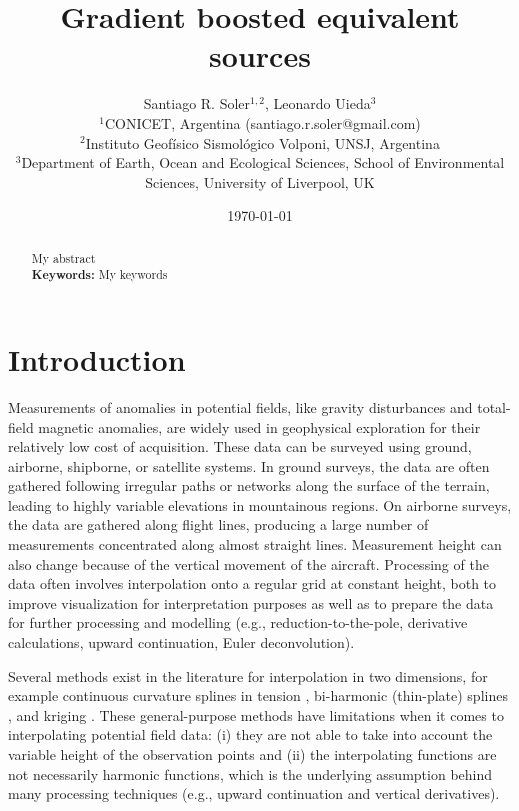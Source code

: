 \documentclass[twocolumn]{article}
\makeatletter
\newcommand{\Title}{
    Gradient boosted equivalent sources
}
\newcommand{\AuthorAffil}{
    {\large
        Santiago R. Soler$^{1,2}$,
        Leonardo Uieda$^{3}$
    }
    \\[0.4cm]
    {\small $^{1}$CONICET, Argentina (santiago.r.soler@gmail.com)} \\
    {\small $^{2}$Instituto Geofísico Sismológico Volponi, UNSJ, Argentina} \\
    {\small $^{3}$Department of Earth, Ocean and Ecological Sciences, School of Environmental Sciences, University of Liverpool, UK} \\
}
\makeatother
\begin{document}
\title{\Title}
\author{\AuthorAffil}
\date{
    \normalsize
    \today
}
\maketitle

\begin{abstract}
    My abstract
    \\[0.5cm]
    \textbf{Keywords:}
    My keywords
\end{abstract}


\section{Introduction}

Measurements of anomalies in potential fields, like gravity disturbances and
total-field magnetic anomalies, are widely used in geophysical exploration for
their relatively low cost of acquisition.
These data can be surveyed using ground, airborne, shipborne, or satellite
systems.
In ground surveys, the data are often gathered following irregular paths or
networks along the surface of the terrain, leading to highly variable
elevations in mountainous regions.
On airborne surveys, the data are gathered along flight lines, producing a
large number of measurements concentrated along almost straight lines.
Measurement height can also change because of the vertical movement of the
aircraft.
Processing of the data often involves interpolation onto a regular grid at
constant height, both to improve visualization for interpretation purposes as
well as to prepare the data for further processing and modelling (e.g.,
reduction-to-the-pole, derivative calculations, upward continuation, Euler
deconvolution).

Several methods exist in the literature for interpolation in two dimensions,
for example continuous curvature splines in tension \citep{smith1990},
bi-harmonic (thin-plate) splines \citep{sandwell1987}, and kriging \citep{hansen1993}.
These general-purpose methods have limitations when it comes to interpolating
potential field data:
(i) they are not able to take into account the variable height of the
observation points and
(ii) the interpolating functions are not necessarily harmonic functions, which
is the underlying assumption behind many processing techniques
(e.g., upward continuation and vertical derivatives).
\end{document}
